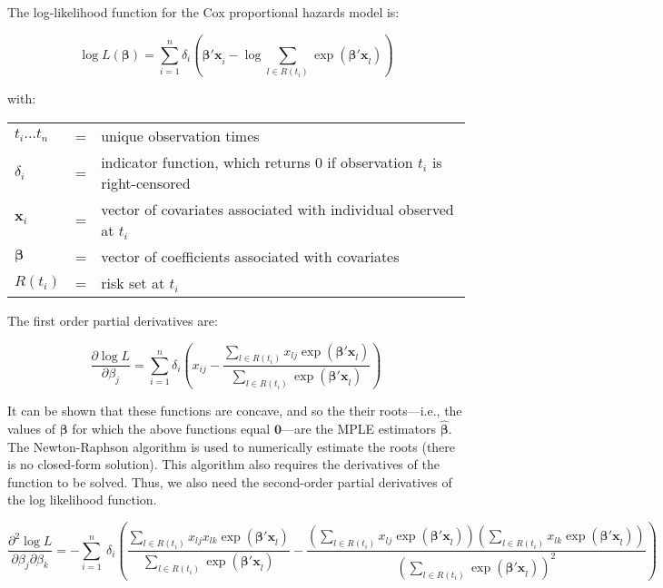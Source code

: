 \documentclass{article}
\begin{document}
The log-likelihood function for the Cox proportional hazards model is:

\begin{equation}
\log L(\bm{\beta}) = \sum_{i=1}^n \delta_i \left( \bm{\beta'x}_i - \log \sum_{l
\in R(t_i)} \exp{(\bm{\beta' x}_l)}\right)
\end{equation}

with:
\begin{tabular}{l c l}
$t_i...t_n$ & = & unique observation times \\
$\delta_i$ & = & indicator function, which returns 0 if observation $t_i$ is
right-censored \\
$\bm{x}_i$ & = & vector of covariates associated with individual observed at
$t_i$ \\
$\bm{\beta}$ & = & vector of coefficients associated with covariates \\
$R(t_i)$ & = & risk set at $t_i$
\end{tabular}

\bigskip

The first order partial derivatives are:

\begin{equation}
\frac{\partial \log L}{\partial \beta_j} = 
	\sum_{i=1}^n 
	\delta_i
	\left( 
	x_{ij} - \frac{\sum_{l \in R(t_i)} x_{lj} \exp(\bm{\beta'x}_l)}
	{ \sum_{l \in R(t_i)} \exp(\bm{\beta'x}_l)}
	\right)
\end{equation}

It can be shown that these functions are concave, and so the their roots---i.e.,
the values of $\bm{\beta}$ for which the above functions equal $\bm{0}$---are the MPLE
estimators $\hat{\bm{\beta}}$. The Newton-Raphson algorithm is used to numerically
estimate the roots (there is no closed-form solution). This algorithm also
requires the derivatives of the function to be solved. Thus, we also need the
second-order partial derivatives of the log likelihood function.

\begin{equation}
\frac{\partial^2 \log L}{\partial \beta_j \partial \beta_k} = 
-
\sum_{i=1}^n \
\delta_i
	\left( 
	\frac{\sum_{l \in R(t_i)} x_{lj}x_{lk} \exp(\bm{\beta'x}_l)}
	{\sum_{l \in R(t_i)} \exp(\bm{\beta'x}_l)}
- 
\frac{
	\left(\sum_{l \in R(t_i)} x_{lj} \exp(\bm{\beta'x}_l)\right)
	\left(\sum_{l \in R(t_i)} x_{lk} \exp(\bm{\beta'x}_l)\right)
}
	{
		\left(
		\sum_{l \in R(t_i)} \exp(\bm{\beta'x}_l)
		\right)^2
		}
	\right)
\end{equation}
\end{document}
